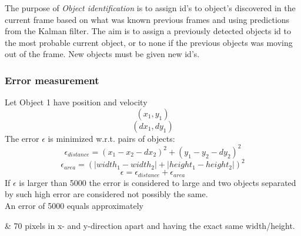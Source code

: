 The purpose of \emph{Object identification} is to assign id's to object's discovered in the current frame based on what was known previous frames and using predictions from the Kalman filter. The aim is to assign a previously detected objects id to the most probable current object, or to none if the previous objects was moving out of the frame. New objects must be given new id's. 

\subsubsection{Error measurement}
Let Object 1 have position and velocity
\begin{equation}
(x_1, y_1)
\end{equation}
\begin{equation}
(dx_1, dy_1)
\end{equation}
The error $\epsilon$ is minimized w.r.t. pairs of objects:
\begin{equation}
  \epsilon_{distance} = (x_1 - x_2 - dx_2)^2 + (y_1 - y_2 - dy_2)^2
\end{equation}
\begin{equation}
  \epsilon_{area} = (|width_1 - width_2| + |height_1 - height_2|)^2
\end{equation}
\begin{equation}
  \epsilon = \epsilon_{distance} + \epsilon_{area}
\end{equation}
If $\epsilon$ is larger than 5000 the error is considered to large and two objects separated by such high error are considered not possibly the same.\\
\newline
An error of 5000 equals approximately
\begin{easylist}
& 70 pixels in x- and y-direction apart and having the exact same width/height.
\end{easylist}


